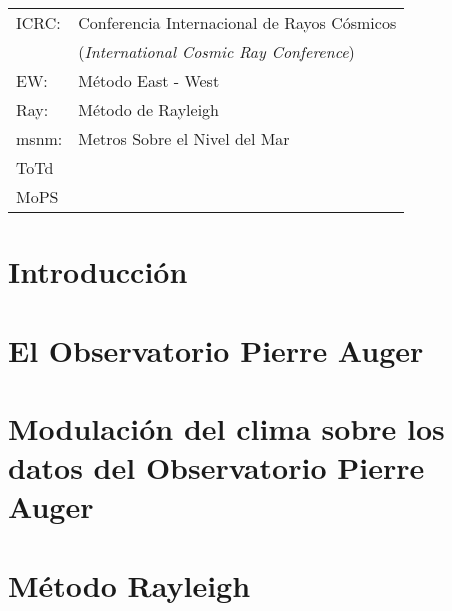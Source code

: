\documentclass[12pt,papel,twoside,pagebackref]{ibtesis}
\begin{document}
\begin{preliminary}
\begin{abreviaturas}
\begin{tabular}{l l}
ICRC: 		& Conferencia Internacional de Rayos Cósmicos \\
			& (\emph{International Cosmic Ray Conference})\\
EW:			& Método East - West\\
Ray:		& Método de Rayleigh\\
msnm:		& Metros Sobre el Nivel del Mar\\
ToTd		& \\
MoPS		& \\
\end{tabular}
\end{abreviaturas}

	\tableofcontents                %
	\listoffigures                  %
	\listoftables                   %

	

\end{preliminary}

\chapter{Introducción}
	\graphicspath{{../01_Introduccion/}}
	
  
\chapter{El Observatorio Pierre Auger}
	\graphicspath{{../02_IntroduccionAuger/}}
	

	\graphicspath{{../03_IntroduccionReport/}}
	

\chapter{Modulación del clima sobre los datos del Observatorio Pierre Auger}

	\graphicspath{{../04_Clima/}}
	
	
	
	
	

	
\chapter{Método Rayleigh}
	\graphicspath{{../05_MetodoRayleigh/}}
	
\end{document}
